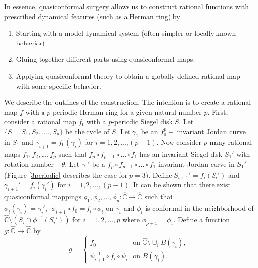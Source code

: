 \documentclass[12pt]{article}
\begin{document}
In essence, quasiconformal surgery allows us to construct rational functions with prescribed dynamical features (such as a Herman ring) by
\begin{enumerate}
    \item Starting with a model dynamical system (often simpler or locally known behavior).
    \item Gluing together different parts using quasiconformal maps.
    \item Applying quasiconformal theory to obtain a globally defined rational map with some specific behavior.
\end{enumerate}
We describe the outlines of the construction. The intention is to create a rational map $f$ with a $p$-periodic Herman ring for a given natural number $p$. First, consider a rational map $f_0$ with a $p$-periodic Siegel disk $S$. Let $\{S=S_1, S_2,....,S_p\}$ be the cycle of $S$. Let $\gamma_1$ be an $f_0^p-$ invariant Jordan curve in $S_1$ and $\gamma_{i+1}=f_0(\gamma_{i})$ for $i=1,2,...,(p-1)$. Now consider $p$ many rational maps $f_1, f_2,...,f_p$ such that $f_p\circ f_{p-1}\circ ...\circ f_1$ has an invariant Siegel disk $S_1'$ with rotation number $-\theta$. Let $\gamma_1'$ be a $f_p\circ f_{p-1}\circ ...\circ f_1$ invariant Jordan curve in $S_1'$ (Figure \ref{3periodic} describes the case for $p=3$). Define $S_{i+1}'=f_i(S_i')$ and $\gamma_{i+1}'=f_i(\gamma_{i}')$ for $i=1,2,...,(p-1)$.  It can be shown that there exist quasiconformal mappings $\phi_1, \phi_2,...,\phi_p: \widehat{\mathbb{C}} \rightarrow \widehat{\mathbb{C}}$ such that $\phi_i(\gamma_{i})=\gamma_{i}',~~\phi_{i+1}\circ f_0=f_i\circ \phi_i$ on $\gamma_{i}$ and $\phi_i$ is conformal in the neighborhood of $\widehat{\mathbb{C}}\setminus (S_i\cap \phi^{-1}(S_i'))$ for $i=1,2,...,p$ where $\phi_{p+1}=\phi_1$. Define a function \( g :\widehat{\mathbb{C}} \to \widehat{\mathbb{C}}  \) by
\[
g =
\begin{cases}
f_0 & \text{on } \widehat{\mathbb{C}}  \setminus  \cup_{i}B(\gamma_{i}), \\
\psi_{i+1}^{-1} \circ f_i \circ \psi_i & \text{on } B(\gamma_{i}) .
\end{cases}
\]
\end{document}
